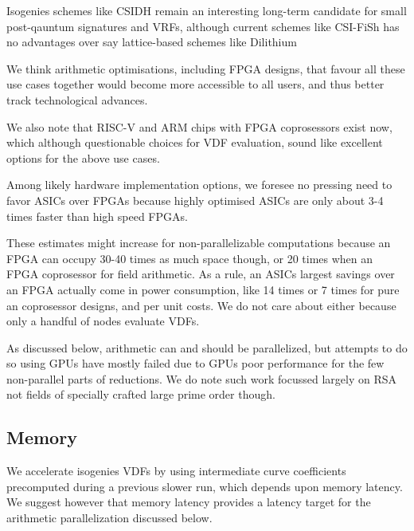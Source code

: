 \documentclass{article}
\begin{document}
Isogenies schemes like CSIDH remain an interesting long-term candidate
for small post-qauntum signatures and VRFs, although current schemes
like CSI-FiSh \cite{CSI-FiSh} has no advantages over say lattice-based
schemes like Dilithium \cite{Dilithium}

We think arithmetic optimisations, including FPGA designs, that favour
all these use cases together would become more accessible to all users,
and thus better track technological advances.

We also note that RISC-V and ARM chips with FPGA coprosessors exist
now, which although questionable choices for VDF evaluation, sound
like excellent options for the above use cases.

Among likely hardware implementation options, 
we foresee no pressing need to favor ASICs over FPGAs because highly
optimised ASICs are only about 3-4 times faster than high speed FPGAs.

These estimates might increase for non-parallelizable computations
because an FPGA can occupy 30-40 times as much space though, or
20 times when an FPGA coprosessor for field arithmetic.
As a rule, an ASICs largest savings over an FPGA actually come in
power consumption, like 14 times or 7 times for pure an coprosessor
designs, and per unit costs.  We do not care about either
because only a handful of nodes evaluate VDFs.  

As discussed below, arithmetic can and should be parallelized,
but attempts to do so using GPUs have mostly failed due to GPUs poor
performance for the few non-parallel parts of reductions.  
We do note such work focussed largely on RSA not fields of specially
crafted large prime order though.

\subsection{Memory}

We accelerate isogenies VDFs by using intermediate curve coefficients
precomputed during a previous slower run, which depends upon memory
latency.  We suggest however that memory latency provides a latency
target for the arithmetic parallelization discussed below.
\end{document}
